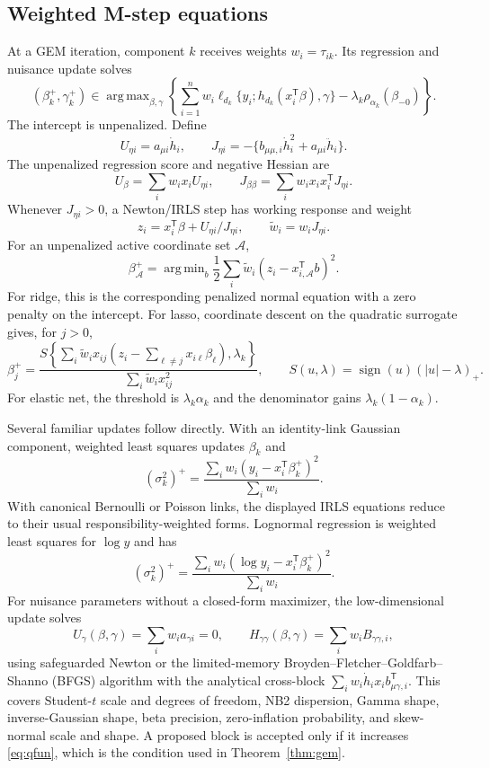 \documentclass[a4paper,fleqn]{cas-sc}
\DeclareMathOperator*{\argmax}{arg\,max}
\DeclareMathOperator*{\argmin}{arg\,min}
\newcommand{\T}{\mathsf T}
\newcommand{\A}{\mathcal A}
\begin{document}
\subsection{Weighted M-step equations}
\label{app:mstep}

At a GEM iteration, component $k$ receives weights $w_i=\tau_{ik}$. Its regression and nuisance update solves
\begin{equation}
 (\beta_k^+,\gamma_k^+)\in\argmax_{\beta,\gamma}
 \left\{\sum_{i=1}^n w_i\ell_{d_k}\{y_i;h_{d_k}(x_i^\T\beta),\gamma\}
 -\lambda_k\rho_{\alpha_k}(\beta_{-0})\right\}.
 \label{eq:weighted-mstep}
\end{equation}
The intercept is unpenalized. Define
\[
 U_{\eta i}=a_{\mu i}\dot h_i,\qquad
 J_{\eta i}=-\{b_{\mu\mu,i}\dot h_i^2+a_{\mu i}\ddot h_i\}.
\]
The unpenalized regression score and negative Hessian are
\[
 U_\beta=\sum_iw_ix_iU_{\eta i},
 \qquad J_{\beta\beta}=\sum_iw_ix_ix_i^\T J_{\eta i}.
\]
Whenever $J_{\eta i}>0$, a Newton/IRLS step has working response and weight
\[
 z_i=x_i^\T\beta+U_{\eta i}/J_{\eta i},
 \qquad \widetilde w_i=w_iJ_{\eta i}.
\]
For an unpenalized active coordinate set $\A$,
\[
 \beta_\A^+=\argmin_b\frac12\sum_i\widetilde w_i(z_i-x_{i,\A}^\T b)^2.
\]
For ridge, this is the corresponding penalized normal equation with a zero penalty on the intercept. For lasso, coordinate descent on the quadratic surrogate gives, for $j>0$,
\[
 \beta_j^+=
 \frac{S\!\left\{\sum_i\widetilde w_i x_{ij}
 (z_i-\sum_{\ell\neq j}x_{i\ell}\beta_\ell),\lambda_k\right\}}
 {\sum_i\widetilde w_i x_{ij}^2},
 \qquad S(u,\lambda)=\operatorname{sign}(u)(|u|-\lambda)_+.
\]
For elastic net, the threshold is $\lambda_k\alpha_k$ and the denominator gains $\lambda_k(1-\alpha_k)$.

Several familiar updates follow directly. With an identity-link Gaussian component, weighted least squares updates $\beta_k$ and
\[
 (\sigma_k^2)^+=\frac{\sum_iw_i(y_i-x_i^\T\beta_k^+)^2}{\sum_iw_i}.
\]
With canonical Bernoulli or Poisson links, the displayed IRLS equations reduce to their usual responsibility-weighted forms. Lognormal regression is weighted least squares for $\log y$ and has
\[
 (\sigma_k^2)^+=\frac{\sum_iw_i(\log y_i-x_i^\T\beta_k^+)^2}{\sum_iw_i}.
\]
For nuisance parameters without a closed-form maximizer, the low-dimensional update solves
\[
 U_\gamma(\beta,\gamma)=\sum_iw_i a_{\gamma i}=0,
 \qquad
 H_{\gamma\gamma}(\beta,\gamma)=\sum_iw_iB_{\gamma\gamma,i},
\]
using safeguarded Newton or the limited-memory Broyden--Fletcher--Goldfarb--Shanno (BFGS) algorithm with the analytical cross-block $\sum_iw_i\dot h_i x_i b_{\mu\gamma,i}^\T$. This covers Student-$t$ scale and degrees of freedom, NB2 dispersion, Gamma shape, inverse-Gaussian shape, beta precision, zero-inflation probability, and skew-normal scale and shape. A proposed block is accepted only if it increases \eqref{eq:qfun}, which is the condition used in Theorem~\ref{thm:gem}.



\end{document}

